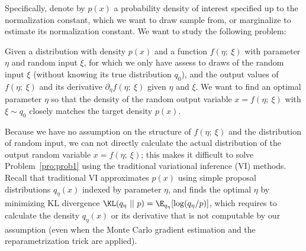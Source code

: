 \documentclass{article} \usepackage{iclr2017_conference,times}
\begin{document}
Specifically, denote by $p(x)$ a probability density of interest specified up to the normalization constant, which we want to draw sample from, or marginalize to estimate its normalization constant. We want to study the following problem: 

\begin{problem}\label{pro:prob1}
Given a distribution with density $p(x)$ and a function $f(\eta;~\xi)$ with parameter $\eta$ and random input $\xi$, 
for which we only have assess to draws of the random input $\xi$ (without knowing its true distribution $q_0$), 
and the output values of $f(\eta;~\xi)$ and its derivative $\partial_\eta f(\eta;~\xi)$ given $\eta$ and $\xi$.  
We want to find an optimal parameter $\eta$ so that the density of the random output variable $x = f(\eta;~\xi)$ with $\xi\sim q_0$ closely matches the target density $p(x)$. 
\end{problem}

Because we have no assumption on the structure of $f(\eta;~\xi)$ 
and the distribution of random input,
we can not directly calculate the actual distribution of the output random variable $x = f(\eta;~\xi)$; 
this makes it difficult to solve Problem~\ref{pro:prob1} using the traditional variational inference (VI) methods. 
Recall that traditional VI approximates $p(x)$ using simple proposal distributions $q_\eta(x)$ indexed by parameter $\eta$, 
and finds the optimal $\eta$ by minimizing KL divergence $\KL(q_\eta ~||~p) = \E_{q_\eta}[\log (q_\eta/p)]$, 
which requires to calculate the density $q_\eta(x)$ or its derivative that is not computable by our assumption 
(even when the Monte Carlo gradient estimation and the reparametrization trick \citep{kingma2013auto} are applied).  


\begin{comment}
\begin{figure}[t]
   \centering
   \scalebox{1}{
   \texttt{[image: figures/neuralsampler1]}}
   \begin{picture}(0,0)(0,0)
   \put(-250,-10){\figcapsize \emph{Given distribution}}
      \put(-170,-10){{\figcapsize \emph{Black-box neural sampler}}}
\put(-50,-10){\figcapsize \emph{Samples}}
   \end{picture}\\[.5em]
   \caption{\figcapsize   
   Our methods ``learn to draw samples'',  
   constructing black-box neural samplers for given distributions. 
   It allows us to automatize the hyper-parameter tuning of Bayesian inference, 
 speed up the inference inner loops of learning algorithms, 
and eventually replace hand-designed inference algorithms with more efficiently one that is trained on past tasks and is improved adaptively over time.}
\label{fig:example}
\end{figure}
\end{comment}
\end{document}
